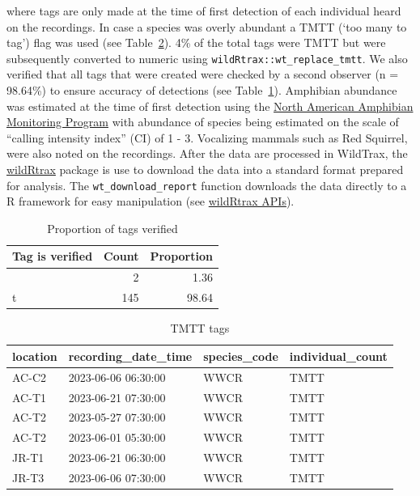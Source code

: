 \documentclass[
  letterpaper,
  DIV=11,
  numbers=noendperiod,
  oneside]{scrartcl}
\begin{document}
where tags are only made at the time of first detection of each
individual heard on the recordings. In case a species was overly
abundant a TMTT (`too many to tag') flag was used (see
Table~\ref{tbl-tmtt}). 4\% of the total tags were TMTT but were
subsequently converted to numeric using
\texttt{wildRtrax::wt\_replace\_tmtt}. We also verified that all tags
that were created were checked by a second observer (n = 98.64\%) to
ensure accuracy of detections (see Table~\ref{tbl-verified}). Amphibian
abundance was estimated at the time of first detection using the
\href{https://www.usgs.gov/centers/eesc/science/north-american-amphibian-monitoring-program}{North
American Amphibian Monitoring Program} with abundance of species being
estimated on the scale of ``calling intensity index'' (CI) of 1 - 3.
Vocalizing mammals such as Red Squirrel, were also noted on the
recordings. After the data are processed in WildTrax, the
\href{https://abbiodiversity.github.io/wildRtrax/}{wildRtrax} package is
use to download the data into a standard format prepared for analysis.
The \texttt{wt\_download\_report} function downloads the data directly
to a R framework for easy manipulation (see
\href{https://abbiodiversity.github.io/wildRtrax/articles/apis.html}{wildRtrax
APIs}).

\hypertarget{tbl-verified}{}
\begin{table}
\caption{\label{tbl-verified}Proportion of tags verified }\tabularnewline

\centering
\begin{tabular}{l|r|r}
\hline
Tag is verified & Count & Proportion\\
\hline
 & 2 & 1.36\\
\hline
t & 145 & 98.64\\
\hline
\end{tabular}
\end{table}

\hypertarget{tbl-tmtt}{}
\begin{table}
\caption{\label{tbl-tmtt}TMTT tags }\tabularnewline

\centering
\begin{tabular}{l|l|l|l}
\hline
location & recording\_date\_time & species\_code & individual\_count\\
\hline
AC-C2 & 2023-06-06 06:30:00 & WWCR & TMTT\\
\hline
AC-T1 & 2023-06-21 07:30:00 & WWCR & TMTT\\
\hline
AC-T2 & 2023-05-27 07:30:00 & WWCR & TMTT\\
\hline
AC-T2 & 2023-06-01 05:30:00 & WWCR & TMTT\\
\hline
JR-T1 & 2023-06-21 06:30:00 & WWCR & TMTT\\
\hline
JR-T3 & 2023-06-06 07:30:00 & WWCR & TMTT\\
\hline
\end{tabular}
\end{table}
\end{document}
